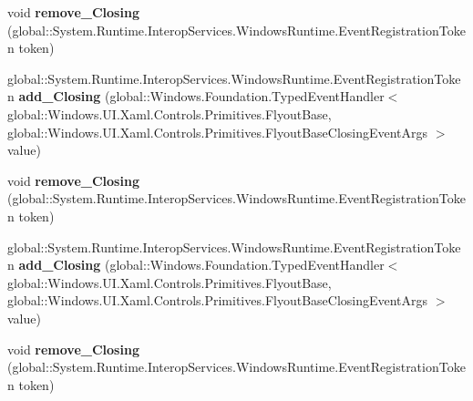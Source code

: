 \begin{DoxyCompactItemize}
\item 
\mbox{\label{interface_windows_1_1_u_i_1_1_xaml_1_1_controls_1_1_primitives_1_1_i_flyout_base2_a77bb61b674028f7f98f003b0694b180e}} 
void {\bfseries remove\+\_\+\+Closing} (global\+::\+System.\+Runtime.\+Interop\+Services.\+Windows\+Runtime.\+Event\+Registration\+Token token)
\item 
\mbox{\label{interface_windows_1_1_u_i_1_1_xaml_1_1_controls_1_1_primitives_1_1_i_flyout_base2_a95eddb9c9237f55550e710d800416b2d}} 
global\+::\+System.\+Runtime.\+Interop\+Services.\+Windows\+Runtime.\+Event\+Registration\+Token {\bfseries add\+\_\+\+Closing} (global\+::\+Windows.\+Foundation.\+Typed\+Event\+Handler$<$ global\+::\+Windows.\+U\+I.\+Xaml.\+Controls.\+Primitives.\+Flyout\+Base, global\+::\+Windows.\+U\+I.\+Xaml.\+Controls.\+Primitives.\+Flyout\+Base\+Closing\+Event\+Args $>$ value)
\item 
\mbox{\label{interface_windows_1_1_u_i_1_1_xaml_1_1_controls_1_1_primitives_1_1_i_flyout_base2_a77bb61b674028f7f98f003b0694b180e}} 
void {\bfseries remove\+\_\+\+Closing} (global\+::\+System.\+Runtime.\+Interop\+Services.\+Windows\+Runtime.\+Event\+Registration\+Token token)
\item 
\mbox{\label{interface_windows_1_1_u_i_1_1_xaml_1_1_controls_1_1_primitives_1_1_i_flyout_base2_a95eddb9c9237f55550e710d800416b2d}} 
global\+::\+System.\+Runtime.\+Interop\+Services.\+Windows\+Runtime.\+Event\+Registration\+Token {\bfseries add\+\_\+\+Closing} (global\+::\+Windows.\+Foundation.\+Typed\+Event\+Handler$<$ global\+::\+Windows.\+U\+I.\+Xaml.\+Controls.\+Primitives.\+Flyout\+Base, global\+::\+Windows.\+U\+I.\+Xaml.\+Controls.\+Primitives.\+Flyout\+Base\+Closing\+Event\+Args $>$ value)
\item 
\mbox{\label{interface_windows_1_1_u_i_1_1_xaml_1_1_controls_1_1_primitives_1_1_i_flyout_base2_a77bb61b674028f7f98f003b0694b180e}} 
void {\bfseries remove\+\_\+\+Closing} (global\+::\+System.\+Runtime.\+Interop\+Services.\+Windows\+Runtime.\+Event\+Registration\+Token token)

\end{DoxyCompactItemize}
